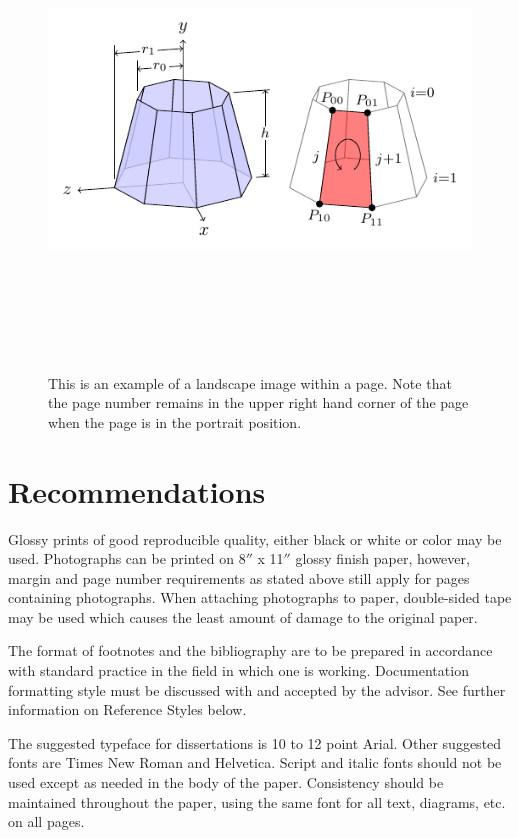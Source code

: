 \documentclass[12pt]{report}
\begin{document}
\begin{figure}
\centering
\includegraphics[height=5.0in, width=7.5in]{3d-cone.pdf}
\caption{This is an example of a landscape image within a page.  Note that the page number remains in the upper right hand corner of the page when the page is in the portrait position.}
\end{figure}




\chapter{Recommendations}

Glossy prints of good reproducible quality, either black or white or color may be used. Photographs can be printed on 8$''$ x 11$''$ glossy finish paper, however, margin and page number requirements as stated above still apply for pages containing photographs. When attaching photographs to paper, double-sided tape may be used which causes the least amount of damage to the original paper.

The format of footnotes and the bibliography are to be prepared in accordance with standard practice in the field in which one is working. Documentation formatting style must be discussed with and accepted by the advisor. See further information on Reference Styles below.

The suggested typeface for dissertations is 10 to 12 point Arial. Other suggested fonts are Times New Roman and Helvetica. Script and italic fonts should not be used except as needed in the body of the paper. Consistency should be maintained throughout the paper, using the same font for all text, diagrams, etc. on all pages.
\end{document}
